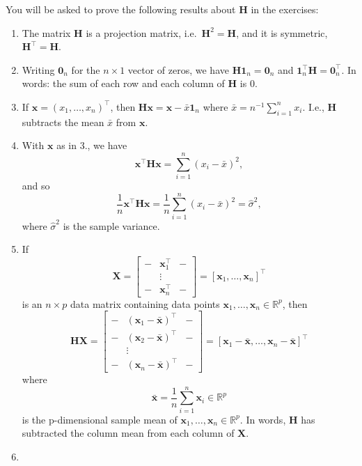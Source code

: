 \documentclass[
]{book}
\providecommand{\tightlist}{%
  \setlength{\itemsep}{0pt}\setlength{\parskip}{0pt}}
\theoremstyle{definition}
\theoremstyle{definition}
\theoremstyle{definition}
\theoremstyle{definition}
\theoremstyle{remark}
\begin{document}
You will be asked to prove the following results about \(\mathbf H\) in the exercises:

\begin{enumerate}
\def\labelenumi{\arabic{enumi}.}
\tightlist
\item
  The matrix \(\mathbf H\) is a projection matrix, i.e.~\(\mathbf H^2=\mathbf H\), and it is symmetric, \(\mathbf H^\top =\mathbf H\).
\item
  Writing \({\mathbf 0}_n\) for the \(n \times 1\) vector of zeros, we have
  \(\mathbf H{\mathbf 1}_n={\mathbf 0}_n\) and \({\mathbf 1}_n^\top \mathbf H={\mathbf 0}_n^\top.\) In words: the sum of each row and each column of \(\mathbf H\) is \(0\).
\item
  If \(\mathbf x=(x_1, \ldots , x_n)^\top\), then \(\mathbf H\mathbf x= \mathbf x- \bar{x}{\mathbf 1}_n\) where \(\bar{x}=n^{-1}\sum_{i=1}^n x_i\). I.e., \(\mathbf H\) subtracts the mean \(\bar{x}\) from \(\mathbf x\).
\item
  With \(\mathbf x\) as in 3., we have
  \[
  \mathbf x^\top \mathbf H\mathbf x= \sum_{i=1}^n (x_i-\bar{x})^2,
  \]
  and so
  \[
  \frac{1}{n}\mathbf x^\top \mathbf H\mathbf x=\frac{1}{n}\sum_{i=1}^n (x_i-\bar{x})^2 = \hat{\sigma}^2,
  \]
  where \(\hat{\sigma}^2\) is the sample variance.
\item
  If
  \[\mathbf X=\left[\begin{array}{ccc}-&\mathbf x_1^\top&-\\ 
  &\vdots& \\ -&\mathbf x_n^\top&-\end{array}\right] = [\mathbf x_1, \ldots, \mathbf x_n]^\top\]
  is an \(n \times p\) data matrix containing data points \(\mathbf x_1, \ldots, \mathbf x_n\in \mathbb{R}^p\), then
  \[
  \mathbf H\mathbf X=\left[ \begin{array}{ccc}
  -&(\mathbf x_1-\bar{\mathbf x})^\top&-\\
  -&(\mathbf x_2 -\bar{\mathbf x})^\top&-\\
  &\vdots&\\
  -&(\mathbf x_n - \bar{\mathbf x})^\top&-
  \end{array}\right ]= \left[ \mathbf x_1 -\bar{\mathbf x}, \ldots , \mathbf x_n-\bar{\mathbf x}\right]^\top
  \]
  where \[\bar{\mathbf x} = \frac{1}{n} \sum_{i=1}^n \mathbf x_i \in \mathbb{R}^p\]
  is the p-dimensional sample mean of \(\mathbf x_1, \ldots, \mathbf x_n\in \mathbb{R}^p\). In words, \(\mathbf H\) has subtracted the column mean from each column of \(\mathbf X\).
\item

\end{enumerate}
\end{document}
